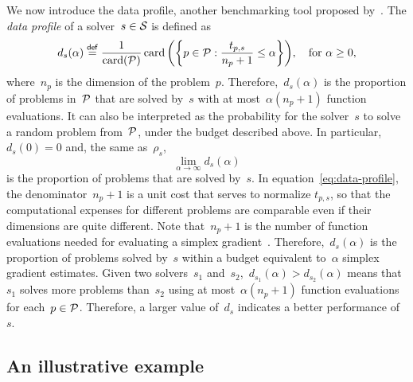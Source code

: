 We now introduce the data profile, another benchmarking tool proposed by~\cite{More_Wild_2009}.
The \emph{data profile} of a solver~$s \in \mathcal{S}$ is defined as
\begin{equation}
    \label{eq:data-profile}
    d_s(\alpha) \eqdef \frac{1}{\card(\xpb)} \card \bigg(\set[\bigg]{p \in \xpb : \frac{t_{p, s}}{n_p + 1} \le \alpha}\bigg), \quad \text{for~$\alpha \ge 0$},
\end{equation}
where~$n_p$ is the dimension of the problem~$p$.
Therefore,~$d_s(\alpha)$ is the proportion of problems in~$\mathcal{P}$ that are solved by~$s$ with at most~$\alpha (n_p + 1)$ function evaluations.
It can also be interpreted as the probability for the solver~$s$ to solve a random problem from~$\mathcal{P}$, under the budget described above.
In particular,~$d_s(0) = 0$ and, the same as~$\rho_s$,
\begin{equation*}
    \lim_{\alpha \to \infty} d_s(\alpha)
\end{equation*}
is the proportion of problems that are solved by~$s$.
In equation~\cref{eq:data-profile}, the denominator~$n_p + 1$ is a unit cost that serves to normalize $t_{p, s}$, so that the computational expenses for different problems are comparable even if their dimensions are quite different.
Note that~$n_p + 1$ is the number of function evaluations needed for evaluating a simplex gradient~\cite{Bortz_Kelley_1998}.
Therefore,~$d_s(\alpha)$ is the proportion of problems solved by~$s$ within a budget equivalent to~$\alpha$ simplex gradient estimates.
Given two solvers~$s_1$ and~$s_2$,~$d_{s_1}(\alpha) > d_{s_2}(\alpha)$ means that~$s_1$ solves more problems than~$s_2$ using at most~$\alpha (n_p + 1)$ function evaluations for each~$p \in \mathcal{P}$.
Therefore, a larger value of~$d_s$ indicates a better performance of~$s$.

\subsection{An illustrative example}

